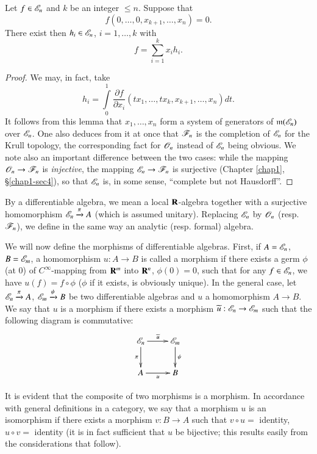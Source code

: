 \begin{lemma}\label{chap3-lem2.1}
Let $f\in \mathscr{E}_{n}$ and $k$ be an integer $\leq n$. Suppose that 
$$
f(0,\ldots,0,x_{k+1},\ldots,x_{n})=0.
$$
There exist then $h_{i}\in \mathscr{E}_{n}$, $i=1,\ldots,k$ with
$$
f=\sum\limits^{k}_{i=1}x_{i}h_{i}.
$$
\end{lemma}

\begin{proof}
We may, in fact, take
$$
h_{i}=\int\limits^{1}_{0}\dfrac{\partial f}{\partial x_{i}}(tx_{1},\ldots,tx_{k},x_{k+1},\ldots,x_{n})dt.
$$
It follows from this lemma that $x_{1},\ldots,x_{n}$ form a system of generators of $\mathfrak{m}(\mathscr{E}_{n})$ over $\mathscr{E}_{n}$. One also deduces from it at once that $\mathscr{F}_{n}$ is the completion of $\mathscr{E}_{n}$ for the Krull topology, the corresponding fact for $\mathscr{O}_{n}$ instead of $\mathscr{E}_{n}$ being obvious. We note also an important difference between the two cases: while the mapping $\mathscr{O}_{n}\to \mathscr{F}_{n}$ is {\em injective}, the mapping $\mathscr{E}_{n}\to \mathscr{F}_{n}$ is surjective (Chapter \ref{chap1}, \S\ref{chap1-sec4}), so that $\mathscr{E}_{n}$ is, in some sense, ``complete but not Hausdorff''.
\end{proof}

\begin{definition}\label{chap3-defi2.2}
By a differentiable algebra, we mean a local $\mathbf{R}$-algebra together with a surjective homomorphism $\mathscr{E}_{n}\xrightarrow{\pi}A$ (which is assumed unitary). Replacing $\mathscr{E}_{n}$ by $\mathscr{O}_{n}$ (resp. $\mathscr{F}_{n}$), we define in the same way an analytic (resp. formal) algebra.
\end{definition}

We will now define the morphisms of differentiable algebras. First, if $A=\mathscr{E}_{n}$, $B=\mathscr{E}_{m}$, a homomorphism $u:A\to B$ is called a morphism if there exists a germ $\phi$ (at 0) of $C^{\infty}$-mapping from $\mathbf{R}^{m}$ into $\mathbf{R}^{n}$, $\phi(0)=0$, such that for any $f\in \mathscr{E}_{n}$, we have $u(f)=f\circ \phi$ ($\phi$ if it exists, is obviously unique). In the general case, let $\mathscr{E}_{n}\xrightarrow{\pi}A$, $\mathscr{E}_{m}\xrightarrow{\psi}B$ be two differentiable algebras and $u$ a homomorphism $A\to B$. We say that $u$ is a morphism if there exists a morphism $\widetilde{u}:\mathscr{E}_{n}\to \mathscr{E}_{m}$ such that the following diagram is commutative:
\[
\xymatrix{
\scrE_{n}\ar[d]_{\pi}\ar[r]^{\widetilde{u}} & \scrE_{m}\ar[d]^{\psi}\\
A\ar[r]_{u} & B
}
\]

It is evident that the composite of two morphisms is a morphism. In accordance with general definitions in a category, we say that a morphism $u$ is an isomorphism if there exists a morphism $v:B\to A$ such that $v\circ u=$ identity, $u\circ v=$ identity (it is in fact sufficient that $u$ be bijective; this results easily from the considerations that follow).

